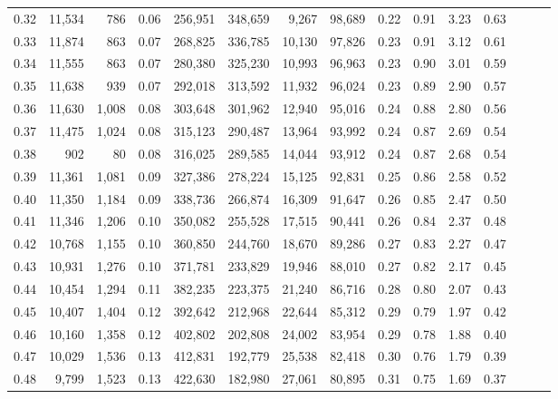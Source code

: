 \begin{tabular}{rrrrrrrrrrrrrrr}
0.32 &  11,534 &    786 &  0.06 &  256,951 &  348,659 &    9,267 &   98,689 &  0.22 &  0.91 &  3.23 &      0.63 \\
0.33 &  11,874 &    863 &  0.07 &  268,825 &  336,785 &   10,130 &   97,826 &  0.23 &  0.91 &  3.12 &      0.61 \\
0.34 &  11,555 &    863 &  0.07 &  280,380 &  325,230 &   10,993 &   96,963 &  0.23 &  0.90 &  3.01 &      0.59 \\
0.35 &  11,638 &    939 &  0.07 &  292,018 &  313,592 &   11,932 &   96,024 &  0.23 &  0.89 &  2.90 &      0.57 \\
0.36 &  11,630 &  1,008 &  0.08 &  303,648 &  301,962 &   12,940 &   95,016 &  0.24 &  0.88 &  2.80 &      0.56 \\
0.37 &  11,475 &  1,024 &  0.08 &  315,123 &  290,487 &   13,964 &   93,992 &  0.24 &  0.87 &  2.69 &      0.54 \\
0.38 &     902 &     80 &  0.08 &  316,025 &  289,585 &   14,044 &   93,912 &  0.24 &  0.87 &  2.68 &      0.54 \\
0.39 &  11,361 &  1,081 &  0.09 &  327,386 &  278,224 &   15,125 &   92,831 &  0.25 &  0.86 &  2.58 &      0.52 \\
0.40 &  11,350 &  1,184 &  0.09 &  338,736 &  266,874 &   16,309 &   91,647 &  0.26 &  0.85 &  2.47 &      0.50 \\
0.41 &  11,346 &  1,206 &  0.10 &  350,082 &  255,528 &   17,515 &   90,441 &  0.26 &  0.84 &  2.37 &      0.48 \\
0.42 &  10,768 &  1,155 &  0.10 &  360,850 &  244,760 &   18,670 &   89,286 &  0.27 &  0.83 &  2.27 &      0.47 \\
0.43 &  10,931 &  1,276 &  0.10 &  371,781 &  233,829 &   19,946 &   88,010 &  0.27 &  0.82 &  2.17 &      0.45 \\
0.44 &  10,454 &  1,294 &  0.11 &  382,235 &  223,375 &   21,240 &   86,716 &  0.28 &  0.80 &  2.07 &      0.43 \\
0.45 &  10,407 &  1,404 &  0.12 &  392,642 &  212,968 &   22,644 &   85,312 &  0.29 &  0.79 &  1.97 &      0.42 \\
0.46 &  10,160 &  1,358 &  0.12 &  402,802 &  202,808 &   24,002 &   83,954 &  0.29 &  0.78 &  1.88 &      0.40 \\
0.47 &  10,029 &  1,536 &  0.13 &  412,831 &  192,779 &   25,538 &   82,418 &  0.30 &  0.76 &  1.79 &      0.39 \\
0.48 &   9,799 &  1,523 &  0.13 &  422,630 &  182,980 &   27,061 &   80,895 &  0.31 &  0.75 &  1.69 &      0.37 \\

\end{tabular}
